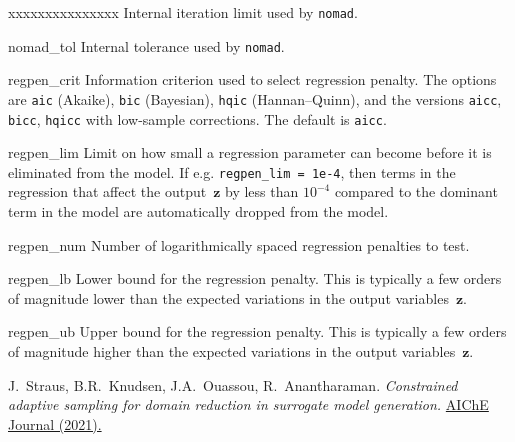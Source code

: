\documentclass[a4paper,bibliography=numbered]{scrartcl}
\begin{document}
\begin{labeling}{xxxxxxxxxxxxxxx}
        Internal iteration limit used by \texttt{nomad}.
    \item[nomad\_tol]
        Internal tolerance used by \texttt{nomad}.
    \item[regpen\_crit]
        Information criterion used to select regression penalty.
        The options are \texttt{aic} (Akaike), \texttt{bic} (Bayesian), \texttt{hqic} (Hannan--Quinn), and the versions \texttt{aicc}, \texttt{bicc}, \texttt{hqicc} with low-sample corrections.
        The default is \texttt{aicc}.
    \item[regpen\_lim]
        Limit on how small a regression parameter can become before it is eliminated from the model.
        If e.g. \texttt{regpen\_lim = 1e-4}, then terms in the regression that affect the output~$\bm{z}$ by less than $10^{-4}$ compared to the dominant term in the model are automatically dropped from the model.
    \item[regpen\_num]
        Number of logarithmically spaced regression penalties to test.
    \item[regpen\_lb]
        Lower bound for the regression penalty.
        This is typically a few orders of magnitude lower than the expected variations in the output variables~$\bm{z}$.
    \item[regpen\_ub]
        Upper bound for the regression penalty.
        This is typically a few orders of magnitude higher than the expected variations in the output variables~$\bm{z}$.
\end{labeling}

\begin{thebibliography}{10}
    J.~Straus, B.R.~Knudsen, J.A.~Ouassou, R.~Anantharaman.
    \emph{Constrained adaptive sampling for domain reduction in surrogate model generation.}
    \href{https://doi.org/10.1002/aic.17357}{AIChE Journal (2021).}
\end{thebibliography}
\end{document}
